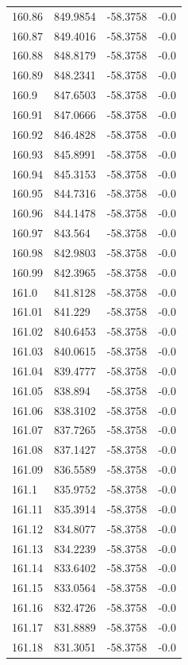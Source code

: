 \begin{table}[H]
\begin{tabular}{llll}
160.86 & 849.9854 & -58.3758 & -0.0 \\
160.87 & 849.4016 & -58.3758 & -0.0 \\
160.88 & 848.8179 & -58.3758 & -0.0 \\
160.89 & 848.2341 & -58.3758 & -0.0 \\
160.9 & 847.6503 & -58.3758 & -0.0 \\
160.91 & 847.0666 & -58.3758 & -0.0 \\
160.92 & 846.4828 & -58.3758 & -0.0 \\
160.93 & 845.8991 & -58.3758 & -0.0 \\
160.94 & 845.3153 & -58.3758 & -0.0 \\
160.95 & 844.7316 & -58.3758 & -0.0 \\
160.96 & 844.1478 & -58.3758 & -0.0 \\
160.97 & 843.564 & -58.3758 & -0.0 \\
160.98 & 842.9803 & -58.3758 & -0.0 \\
160.99 & 842.3965 & -58.3758 & -0.0 \\
161.0 & 841.8128 & -58.3758 & -0.0 \\
161.01 & 841.229 & -58.3758 & -0.0 \\
161.02 & 840.6453 & -58.3758 & -0.0 \\
161.03 & 840.0615 & -58.3758 & -0.0 \\
161.04 & 839.4777 & -58.3758 & -0.0 \\
161.05 & 838.894 & -58.3758 & -0.0 \\
161.06 & 838.3102 & -58.3758 & -0.0 \\
161.07 & 837.7265 & -58.3758 & -0.0 \\
161.08 & 837.1427 & -58.3758 & -0.0 \\
161.09 & 836.5589 & -58.3758 & -0.0 \\
161.1 & 835.9752 & -58.3758 & -0.0 \\
161.11 & 835.3914 & -58.3758 & -0.0 \\
161.12 & 834.8077 & -58.3758 & -0.0 \\
161.13 & 834.2239 & -58.3758 & -0.0 \\
161.14 & 833.6402 & -58.3758 & -0.0 \\
161.15 & 833.0564 & -58.3758 & -0.0 \\
161.16 & 832.4726 & -58.3758 & -0.0 \\
161.17 & 831.8889 & -58.3758 & -0.0 \\
161.18 & 831.3051 & -58.3758 & -0.0 \\

\end{tabular}
\end{table}

